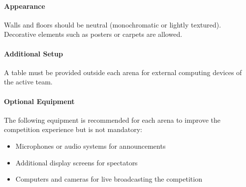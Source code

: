 \paragraph{Appearance}
Walls and floors should be neutral (monochromatic or lightly textured). Decorative elements such as posters or carpets are allowed.

\paragraph{Additional Setup}
A table must be provided outside each arena for external computing devices of the active team.

\paragraph{Optional Equipment}
The following equipment is recommended for each arena to improve the competition experience but is not mandatory:
\begin{itemize}
    \item Microphones or audio systems for announcements
    \item Additional display screens for spectators
    \item Computers and cameras for live broadcasting the competition
\end{itemize}





